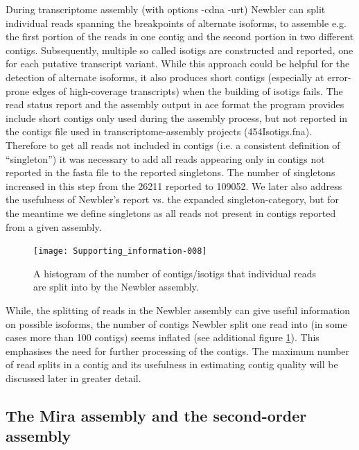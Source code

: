 \documentclass[12pt,a4paper]{article}
\begin{document}
During transcriptome assembly (with options -cdna -urt) Newbler can
split individual reads spanning the breakpoints of alternate isoforms,
to assemble e.g. the first portion of the reads in one contig and the
second portion in two different contigs. Subsequently, multiple so
called isotigs are constructed and reported, one for each putative
transcript variant. While this approach could be helpful for the
detection of alternate isoforms, it also produces short contigs
(especially at error-prone edges of high-coverage transcripts) when
the building of isotigs fails. The read status report and the assembly
output in ace format the program provides include short contigs only
used during the assembly process, but not reported in the contigs file
used in transcriptome-assembly projects (454Isotigs.fna). Therefore to
get all reads not included in contigs (i.e. a consistent definition of
``singleton'') it was necessary to add all reads appearing only in
contigs not reported in the fasta file to the reported singletons. The
number of singletons increased in this step from the
26211 reported to
109052. We later also address the usefulness of
Newbler's report vs. the expanded singleton-category, but for the
meantime we define singletons as all reads not present in contigs
reported from a given assembly.

\newpage
  

\begin{figure}[H]
  \centering
  
\texttt{[image: Supporting\_information-008]}

\caption{A histogram of the number of contigs/isotigs that individual
  reads are split into by the Newbler assembly.}
  \label{fig:newdist}
\end{figure}

While, the splitting of reads in the Newbler assembly can give useful
information on possible isoforms, the number of contigs Newbler split
one read into (in some cases more than 100 contigs) seems inflated
(see additional figure \ref{fig:newdist}). This emphasises the need
for further processing of the contigs. The maximum number of read
splits in a contig and its usefulness in estimating contig quality
will be discussed later in greater detail.

\subsection{The Mira assembly and the second-order assembly}
\label{sec:assembly-sec}
\end{document}
